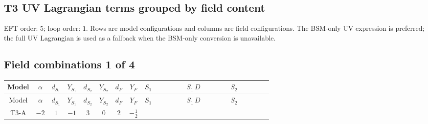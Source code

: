 \documentclass[8pt]{article}
\begin{document}
\begin{landscape}
\section*{T3 UV Lagrangian terms grouped by field content}
EFT order: $5$; loop order: $1$. 
Rows are model configurations and columns are field configurations. The BSM-only UV expression is preferred; the full UV Lagrangian is used as a fallback when the BSM-only conversion is unavailable.
\tiny
\subsection*{Field combinations 1 of 4}
\begin{longtable}{@{}cccccccc >{\raggedright\arraybackslash}p{0.21\linewidth} >{\raggedright\arraybackslash}p{0.21\linewidth} >{\raggedright\arraybackslash}p{0.21\linewidth}@{}}
\toprule
Model & $\alpha$ & $d_{S_1}$ & $Y_{S_1}$ & $d_{S_2}$ & $Y_{S_2}$ & $d_F$ & $Y_F$ & $S_1$ & $S_1\,D$ & $S_2$ \\
\midrule
\endfirsthead
\toprule
Model & $\alpha$ & $d_{S_1}$ & $Y_{S_1}$ & $d_{S_2}$ & $Y_{S_2}$ & $d_F$ & $Y_F$ & $S_1$ & $S_1\,D$ & $S_2$ \\
\midrule
\endhead
T3-A & $-2$ & $1$ & $-1$ & $3$ & $0$ & $2$ & $-\frac{1}{2}$ & \scriptsize\adjustbox{max width=\linewidth}{$\begin{gathered} -S_1 S_1{}^{\dagger } M_{S_1}^2 \\ +\frac{1}{2} S_1^2 \left(S_1{}^{\dagger }\right){}^2 \lambda_{S_1}^{(1)}\end{gathered}$} & \scriptsize\adjustbox{max width=\linewidth}{$\begin{gathered} +D_{\mu _1}\left(S_1\right){}^{\dagger } D_{\mu _1}\left(S_1\right)\end{gathered}$} & \scriptsize\adjustbox{max width=\linewidth}{$\begin{gathered} -M_{S_2}^2 S_{2,j_1} S_{2,j_1}{}^{\dagger } \\ +\frac{1}{2} S_{2,j_3} S_{2,j_4} S_{2,j_1}{}^{\dagger } S_{2,j_2}{}^{\dagger } \mathcal{I}_{S_2,j_1,j_3,j_2,j_4}{}^1 \lambda_{S_2}^{(1)} \\ +\frac{1}{2} S_{2,j_3} S_{2,j_4} S_{2,j_1}{}^{\dagger } S_{2,j_2}{}^{\dagger } \mathcal{I}_{S_2,j_1,j_3,j_2,j_4}{}^2 \lambda_{S_2}^{(2)}\end{gathered}$} \\
\midrule

\end{longtable}
\end{landscape}
\end{document}

